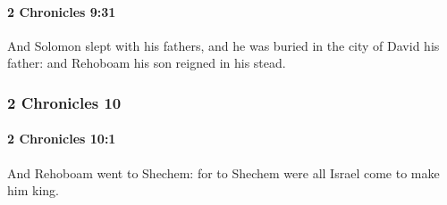 		\paragraph{2 Chronicles 9:31} %
			\label{2CHRONICLES-9-31}

			And Solomon slept with his fathers, and he was buried in the city of David his father: and Rehoboam his son reigned in his stead.

	\subsubsection{2 Chronicles 10} %
		\label{2CHRONICLES-10}

		\paragraph{2 Chronicles 10:1} %
			\label{2CHRONICLES-10-1}

			And Rehoboam went to Shechem: for to Shechem were all Israel come to make him king.

